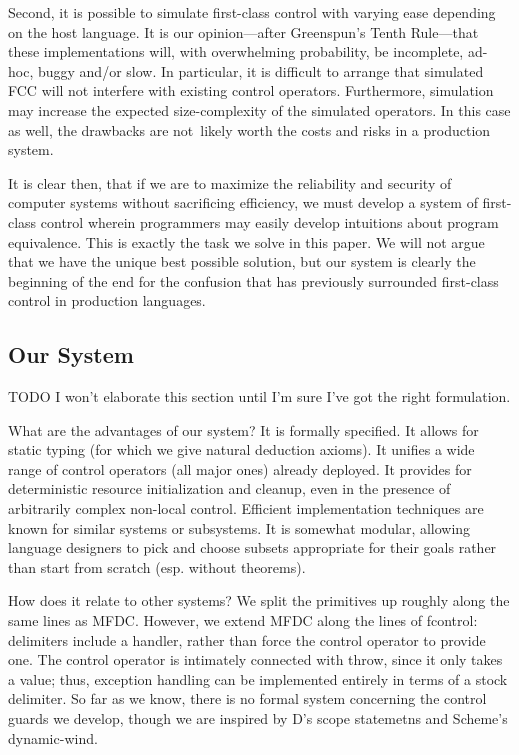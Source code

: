 \documentclass[11pt]{article}
\newcommand{\maybePage}{\newpage}
\begin{document}
Second, it is possible to simulate first-class control with varying ease depending on the host language.
It is our opinion---after Greenspun's Tenth Rule---that these implementations will, with overwhelming probability, be incomplete, ad-hoc, buggy and/or slow.
In particular, it is difficult to arrange that simulated FCC will not interfere with existing control operators.\cite{addDelimControlProduction}
Furthermore, simulation may increase the expected size-complexity of the simulated operators.\cite{finalShiftForCallcc}
In this case as well, the drawbacks are not~likely worth the costs and risks in a production system.



It is clear then, that if we are to maximize the reliability and security of computer systems without sacrificing efficiency, we must develop a system of first-class control wherein programmers may easily develop intuitions about program equivalence.
This is exactly the task we solve in this paper.
We will not argue that we have the unique best possible solution, but our system is clearly the beginning of the end for the confusion that has previously surrounded first-class control in production languages.

\maybePage
\subsection{Our System}

TODO I won't elaborate this section until I'm sure I've got the right formulation.

What are the advantages of our system?
It is formally specified.
It allows for static typing (for which we give natural deduction axioms).
It unifies a wide range of control operators (all major ones) already deployed.
It provides for deterministic resource initialization and cleanup, even in the presence of arbitrarily complex non-local control.
Efficient implementation techniques are known for similar systems or subsystems.
It is somewhat modular, allowing language designers to pick and choose subsets appropriate for their goals rather than start from scratch (esp. without theorems).

How does it relate to other systems?
We split the primitives up roughly along the same lines as MFDC.
However, we extend MFDC along the lines of fcontrol: delimiters include a handler, rather than force the control operator to provide one.
The control operator is intimately connected with throw, since it only takes a value; thus, exception handling can be implemented entirely in terms of a stock delimiter.
So far as we know, there is no formal system concerning the control guards we develop, though we are inspired by D's scope statemetns and Scheme's dynamic-wind. 
\end{document}

